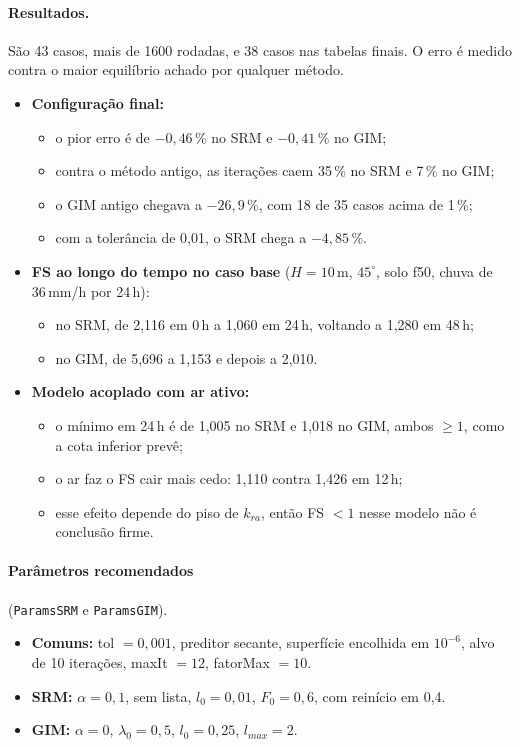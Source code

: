 \paragraph{Resultados.} São 43 casos, mais de 1600 rodadas, e 38 casos nas tabelas finais. O erro é medido contra o
maior equilíbrio achado por qualquer método.
\begin{itemize}
  \item \textbf{Configuração final:}
    \begin{itemize}
      \item o pior erro é de $-0{,}46\,\%$ no SRM e $-0{,}41\,\%$ no GIM;
      \item contra o método antigo, as iterações caem 35\,\% no SRM e 7\,\% no GIM;
      \item o GIM antigo chegava a $-26{,}9\,\%$, com 18 de 35 casos acima de 1\,\%;
      \item com a tolerância de 0,01, o SRM chega a $-4{,}85\,\%$.
    \end{itemize}
  \item \textbf{FS ao longo do tempo no caso base} ($H = 10$\,m, $45^\circ$, solo f50, chuva de 36\,mm/h por 24\,h):
    \begin{itemize}
      \item no SRM, de 2,116 em 0\,h a 1,060 em 24\,h, voltando a 1,280 em 48\,h;
      \item no GIM, de 5,696 a 1,153 e depois a 2,010.
    \end{itemize}
  \item \textbf{Modelo acoplado com ar ativo:}
    \begin{itemize}
      \item o mínimo em 24\,h é de 1,005 no SRM e 1,018 no GIM, ambos $\geq 1$, como a cota inferior prevê;
      \item o ar faz o FS cair mais cedo: 1,110 contra 1,426 em 12\,h;
      \item esse efeito depende do piso de $k_{ra}$, então FS $< 1$ nesse modelo não é conclusão firme.
    \end{itemize}
\end{itemize}

\paragraph{Parâmetros recomendados} (\texttt{ParamsSRM} e \texttt{ParamsGIM}).
\begin{itemize}
  \item \textbf{Comuns:} tol $= 0{,}001$, preditor secante, superfície encolhida em $10^{-6}$, alvo de 10 iterações,
    maxIt $= 12$, fatorMax $= 10$.
  \item \textbf{SRM:} $\alpha = 0{,}1$, sem lista, $l_0 = 0{,}01$, $F_0 = 0{,}6$, com reinício em 0,4.
  \item \textbf{GIM:} $\alpha = 0$, $\lambda_0 = 0{,}5$, $l_0 = 0{,}25$, $l_{max} = 2$.
\end{itemize}

